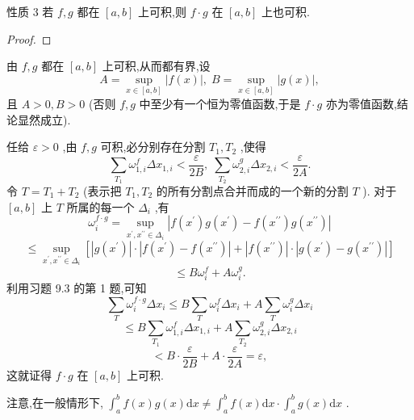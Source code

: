 性质 3 若 \(f,g\) 都在 \(\left\lbrack  {a,b}\right\rbrack\) 上可积,则 \(f \cdot  g\) 在 \(\left\lbrack  {a,b}\right\rbrack\) 上也可积.

\begin{proof}

\end{proof}
由 \(f,g\) 都在 \(\left\lbrack  {a,b}\right\rbrack\) 上可积,从而都有界,设
\[
A = \mathop{\sup }\limits_{{x \in  \left\lbrack  {a,b}\right\rbrack  }}\left| {f\left( x\right) }\right| ,\;B = \mathop{\sup }\limits_{{x \in  \left\lbrack  {a,b}\right\rbrack  }}\left| {g\left( x\right) }\right| ,
\]
且 \(A > 0,B > 0\) (否则 \(f,g\) 中至少有一个恒为零值函数,于是 \(f \cdot  g\) 亦为零值函数,结论显然成立).

任给 \(\varepsilon  > 0\) ,由 \(f,g\) 可积,必分别存在分割 \({T}_{1},{T}_{2}\) ,使得
\[
\mathop{\sum }\limits_{{T}_{1}}{\omega }_{1,i}^{f}\Delta {x}_{1,i} < \frac{\varepsilon }{2B},\;\mathop{\sum }\limits_{{T}_{2}}{\omega }_{2,i}^{g}\Delta {x}_{2,i} < \frac{\varepsilon }{2A}.
\]
令 \(T = {T}_{1} + {T}_{2}\) (表示把 \({T}_{1},{T}_{2}\) 的所有分割点合并而成的一个新的分割 \(T\) ). 对于 \(\left\lbrack  {a,b}\right\rbrack\) 上 \(T\) 所属的每一个 \({\Delta }_{i}\) ,有
\[
{\omega }_{i}^{f \cdot  g} = \mathop{\sup }\limits_{{{x}^{\prime },{x}^{\prime \prime } \in  {\Delta }_{i}}}\left| {f\left( {x}^{\prime }\right) g\left( {x}^{\prime }\right)  - f\left( {x}^{\prime \prime }\right) g\left( {x}^{\prime \prime }\right) }\right|
\]
\[
\leq  \mathop{\sup }\limits_{{{x}^{\prime },{x}^{\prime \prime } \in  {\Delta }_{i}}}\left\lbrack  {\left| {g\left( {x}^{\prime }\right) }\right|  \cdot  \left| {f\left( {x}^{\prime }\right)  - f\left( {x}^{\prime \prime }\right) }\right|  + \left| {f\left( {x}^{\prime \prime }\right) }\right|  \cdot  \left| {g\left( {x}^{\prime }\right)  - g\left( {x}^{\prime \prime }\right) }\right| }\right\rbrack
\]
\[
\leq  B{\omega }_{i}^{f} + A{\omega }_{i}^{g}.
\]
利用习题 9.3 的第 1 题,可知
\[
\mathop{\sum }\limits_{T}{\omega }_{i}^{f \cdot  g}\Delta {x}_{i} \leq  B\mathop{\sum }\limits_{T}{\omega }_{i}^{f}\Delta {x}_{i} + A\mathop{\sum }\limits_{T}{\omega }_{i}^{g}\Delta {x}_{i}
\]
\[
\leq  B\mathop{\sum }\limits_{{T}_{1}}{\omega }_{1,i}^{f}\Delta {x}_{1,i} + A\mathop{\sum }\limits_{{T}_{2}}{\omega }_{2,i}^{g}\Delta {x}_{2,i}
\]
\[
< B \cdot  \frac{\varepsilon }{2B} + A \cdot  \frac{\varepsilon }{2A} = \varepsilon ,
\]
这就证得 \(f \cdot  g\) 在 \(\left\lbrack  {a,b}\right\rbrack\) 上可积.

注意,在一般情形下, \({\int }_{a}^{b}f\left( x\right) g\left( x\right) \mathrm{d}x \neq  {\int }_{a}^{b}f\left( x\right) \mathrm{d}x \cdot  {\int }_{a}^{b}g\left( x\right) \mathrm{d}x\) .

